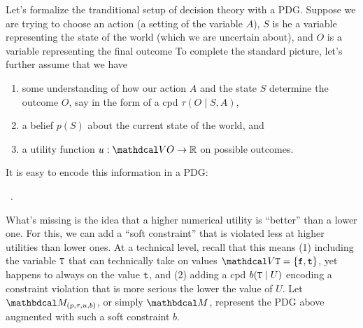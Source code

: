 \documentclass[twoside]{article}
\theoremstyle{plain}
\theoremstyle{definition}
\theoremstyle{remark}
\begin{document}
Let's formalize the tranditional setup of decision theory with a PDG. 
Suppose we are trying to choose an action (a setting of the variable $A$),
$S$ is he a variable representing the state of the world (which we are uncertain about),
and $O$ is a variable representing the final outcome
%
To complete the standard picture, let's further assume that 
we have 
\begin{enumerate}[nosep]
\item 
   some understanding of how our action $A$ and the state $S$ determine the outcome $O$, say in the form of a cpd $\tau(O \mid S,A)$, 
\item 
a belief $p(S)$ about the current state of the world,
and 
\item  a utility function $u : \V O \to \mathbb R$ on possible outcomes. 
\end{enumerate}
It is easy to encode this information in a PDG:

\begin{center}
   ~.
\end{center}

What's missing is the idea 
that a higher numerical utility is ``better'' than a lower one. 
For this, we can add a ``soft constraint'' \citep[see][\S4.2.2]{oli-dissertation} that is violated less at higher utilities than lower ones.
At a technical level, recall that this means 
(1) including the variable ${\tt T}$ that can technically take on values $\V \Tru = \{ \truf, \trut\}$, yet happens to always on the value ${\tt t}$,
and  
(2) adding a cpd $b({\tt T} \mid U)$ encoding a constraint violation that is more serious the lower the value of $U$. 
Let 
$\dg M_{(p, \tau, u, b)}$, or simply $\dg M$, 
represent the PDG above augmented with such a soft constraint $b$. 
\end{document}
